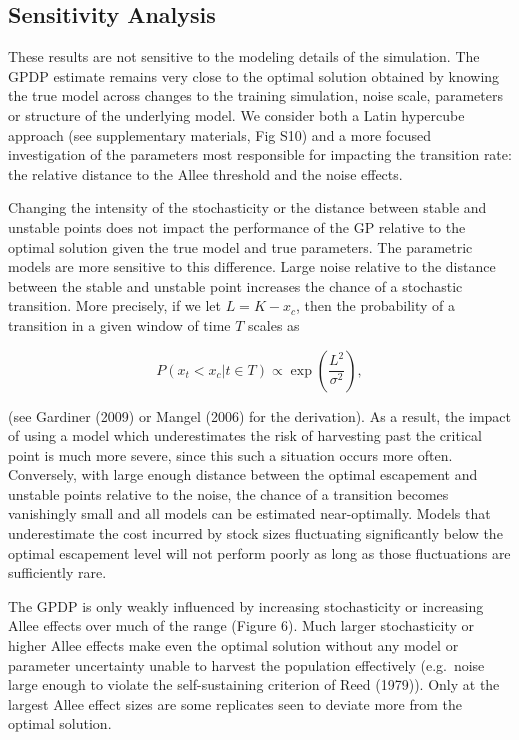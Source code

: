 \documentclass[author-year, 12pt,review]{components/elsarticle} %
\begin{document}
\subsection{Sensitivity Analysis}\label{sensitivity-analysis}

These results are not sensitive to the modeling details of the
simulation. The GPDP estimate remains very close to the optimal solution
obtained by knowing the true model across changes to the training
simulation, noise scale, parameters or structure of the underlying
model. We consider both a Latin hypercube approach (see supplementary
materials, Fig S10) and a more focused investigation of the parameters
most responsible for impacting the transition rate: the relative
distance to the Allee threshold and the noise effects.

Changing the intensity of the stochasticity or the distance between
stable and unstable points does not impact the performance of the GP
relative to the optimal solution given the true model and true
parameters. The parametric models are more sensitive to this difference.
Large noise relative to the distance between the stable and unstable
point increases the chance of a stochastic transition. More precisely,
if we let $L = K - x_c$, then the probability of a transition in a given
window of time $T$ scales as

\[P(x_t < x_c | t \in T) \propto  \exp\left(\frac{L^2}{\sigma^2}\right),\]

(see Gardiner (2009) or Mangel (2006) for the derivation). As a result,
the impact of using a model which underestimates the risk of harvesting
past the critical point is much more severe, since this such a situation
occurs more often. Conversely, with large enough distance between the
optimal escapement and unstable points relative to the noise, the chance
of a transition becomes vanishingly small and all models can be
estimated near-optimally. Models that underestimate the cost incurred by
stock sizes fluctuating significantly below the optimal escapement level
will not perform poorly as long as those fluctuations are sufficiently
rare.

The GPDP is only weakly influenced by increasing stochasticity or
increasing Allee effects over much of the range (Figure 6). Much larger
stochasticity or higher Allee effects make even the optimal solution
without any model or parameter uncertainty unable to harvest the
population effectively (e.g.~noise large enough to violate the
self-sustaining criterion of Reed (1979)). Only at the largest Allee
effect sizes are some replicates seen to deviate more from the optimal
solution.
\end{document}
